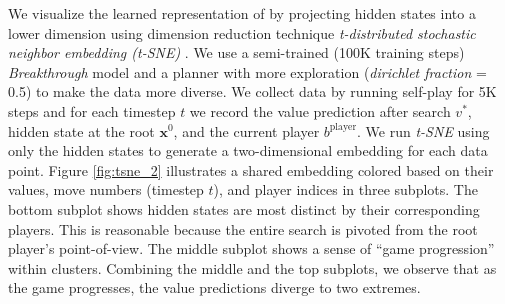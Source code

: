 We visualize the learned representation of \moozi by projecting hidden states into a lower dimension using dimension reduction technique \textit{t-distributed stochastic neighbor embedding (t-SNE)} \cite{VisualizingDataUsing_Maaten.Hinton_2008}.
We use a semi-trained (100K training steps) \textit{Breakthrough} model and a planner with more exploration (\textit{dirichlet fraction} = 0.5) to make the data more diverse.
We collect data by running self-play for 5K steps and for each timestep $t$ we record the value prediction after search $v^{*}$, hidden state at the root $\mathbf{x}^0$, and the current player $b^{\text{player}}$.
We run \textit{t-SNE} using only the hidden states to generate a two-dimensional embedding for each data point.
Figure \ref{fig:tsne_2} illustrates a shared embedding colored based on their values, move numbers (timestep $t$), and player indices in three subplots.
The bottom subplot shows hidden states are most distinct by their corresponding players.
This is reasonable because the entire search is pivoted from the root player's point-of-view.
The middle subplot shows a sense of ``game progression'' within clusters.
Combining the middle and the top subplots, we observe that as the game progresses, the value predictions diverge to two extremes.
